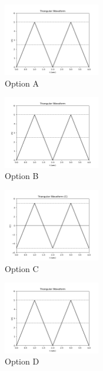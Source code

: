 \documentclass{article}
\begin{document}
\begin{enumerate}
    \begin{figure}[h!]
    \centering
      \hspace{-1cm}
      \includegraphics[width=0.375\textwidth]{Figure_1.png}
      
      \caption{Option A }
      \label{fig:your_label}
    \end{figure}

    \begin{figure}[h!]
    \centering
      \hspace{-1cm}
      \includegraphics[width=0.375\textwidth]{Figure_1.png}
      
      \caption{Option B }
      \label{fig:your_label}
    \end{figure}

    \begin{figure}[h!]
    \centering
      \hspace{-1cm}
      \includegraphics[width=0.375\textwidth]{Figure_3.png}
      
      \caption{Option C }
      \label{fig:your_label}
    \end{figure}

    \begin{figure}[h!]
    \centering
      \hspace{-1cm}
      \includegraphics[width=0.375\textwidth]{Figure_1.png}
      \caption{Option D}
      \label{fig:your_label}
    \end{figure}


\end{enumerate}
\end{document}
